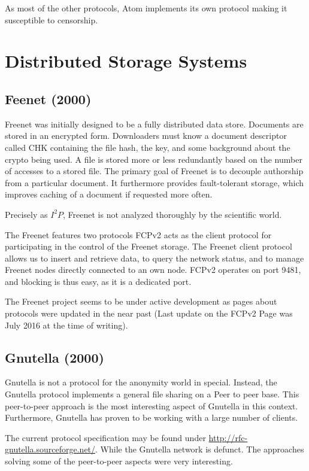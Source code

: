 As most of the other protocols, Atom implements its own protocol making it susceptible to censorship.

\section{Distributed Storage Systems}
\subsection{Feenet (2000)}
Freenet was initially designed to be a fully distributed data store\cite{freenet}. Documents are stored in an encrypted form. Downloaders must know a document descriptor called CHK containing the file hash, the key, and some background about the crypto being used. A file is stored more or less redundantly based on the number of accesses to a stored file. The primary goal of Freenet is to decouple authorship from a particular document. It furthermore provides fault-tolerant storage, which improves caching of a document if requested more often.

Precisely as $I^2P$, Freenet is not analyzed thoroughly by the scientific world. 

The Freenet features two protocols FCPv2 acts as the client protocol for participating in the control of the Freenet storage. The Freenet client protocol allows us to insert and retrieve data, to query the network status, and to manage Freenet nodes directly connected to an own node. FCPv2 operates on port 9481, and blocking is thus easy, as it is a dedicated port. 

The Freenet project seems to be under active development as pages about protocols were updated in the near past (Last update on the FCPv2 Page was July  2016 at the time of writing).

\subsection{Gnutella (2000)}
Gnutella is not a protocol for the anonymity world in special. Instead, the Gnutella protocol implements a general file sharing on a Peer to peer base. This peer-to-peer approach is the most interesting aspect of Gnutella in this context. Furthermore, Gnutella has proven to be working with a large number of clients.

The current protocol specification may be found under \href{http://rfc-gnutella.sourceforge.net/developer/stable/index.html}{http://rfc-gnutella.sourceforge.net/}. While the Gnutella network is defunct. The approaches solving some of the peer-to-peer aspects were very interesting.

